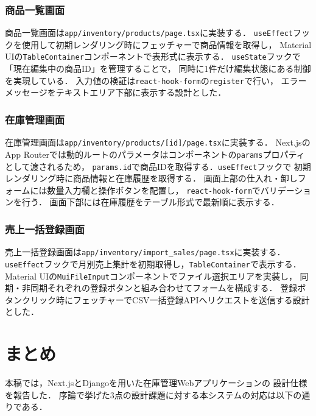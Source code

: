 \documentclass[submit,techrep]{ipsj}
\begin{document}
\subsubsection{商品一覧画面}

商品一覧画面は\texttt{app/inventory/products/page.tsx}に実装する．
\texttt{useEffect}フックを使用して初期レンダリング時にフェッチャーで商品情報を取得し，
Material UI\cite{mui-docs}の\texttt{TableContainer}コンポーネントで表形式に表示する．
\texttt{useState}フックで「現在編集中の商品ID」を管理することで，
同時に1件だけ編集状態にある制御を実現している．
入力値の検証は\texttt{react-hook-form}\cite{react-hook-form}の\texttt{register}で行い，
エラーメッセージをテキストエリア下部に表示する設計とした．

\subsubsection{在庫管理画面}

在庫管理画面は\texttt{app/inventory/products/[id]/page.tsx}に実装する．
Next.jsのApp Routerでは動的ルートのパラメータはコンポーネントの\texttt{params}プロパティとして渡されるため，
\texttt{params.id}で商品IDを取得する．\texttt{useEffect}フックで
初期レンダリング時に商品情報と在庫履歴を取得する．
画面上部の仕入れ・卸しフォームには数量入力欄と操作ボタンを配置し，
\texttt{react-hook-form}でバリデーションを行う．
画面下部には在庫履歴をテーブル形式で最新順に表示する．

\subsubsection{売上一括登録画面}

売上一括登録画面は\texttt{app/inventory/import\_sales/page.tsx}に実装する．
\texttt{useEffect}フックで月別売上集計を初期取得し，\texttt{TableContainer}で表示する．
Material UIの\texttt{MuiFileInput}コンポーネントでファイル選択エリアを実装し，
同期・非同期それぞれの登録ボタンと組み合わせてフォームを構成する．
登録ボタンクリック時にフェッチャーでCSV一括登録APIへリクエストを送信する設計とした．

\section{まとめ}
\label{sec:conclusion}

本稿では，Next.jsとDjangoを用いた在庫管理Webアプリケーションの
設計仕様を報告した．
序論で挙げた3点の設計課題に対する本システムの対応は以下の通りである．
\end{document}
